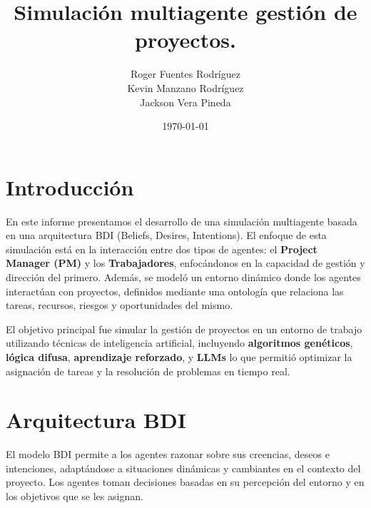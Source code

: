 \documentclass[a4paper, 12pt]{article}
\title{Simulación multiagente gestión de proyectos.}
\author{Roger Fuentes Rodr\'iguez \\ Kevin Manzano Rodr\'iguez \\ Jackson Vera Pineda}
\date{\today}
\begin{document}
\maketitle

\section{Introducción}
En este informe presentamos el desarrollo de una simulación multiagente basada en una arquitectura BDI (Beliefs, Desires, Intentions). El enfoque de esta simulación está en la interacción entre dos tipos de agentes: el \textbf{Project Manager (PM)} y los \textbf{Trabajadores}, enfocándonos en la capacidad de gestión y dirección del primero. Además, se modeló un entorno dinámico donde los agentes interactúan con proyectos, definidos mediante una ontología que relaciona las tareas, recursos, riesgos y oportunidades del mismo.

El objetivo principal fue simular la gestión de proyectos en un entorno de trabajo utilizando técnicas de inteligencia artificial, incluyendo \textbf{algoritmos genéticos}, \textbf{lógica difusa}, \textbf{aprendizaje reforzado}, y \textbf{LLMs} lo que permitió optimizar la asignación de tareas y la resolución de problemas en tiempo real.

\section{Arquitectura BDI}
El modelo BDI permite a los agentes razonar sobre sus creencias, deseos e intenciones, adaptándose a situaciones dinámicas y cambiantes en el contexto del proyecto. Los agentes toman decisiones basadas en su percepción del entorno y en los objetivos que se les asignan.
\end{document}
